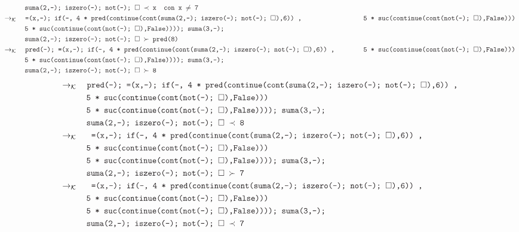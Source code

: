 \documentclass{article}
\newcommand{\tx}[1]{\textcolor{Black} {\texttt{#1}}}
\newcommand{\es}{$\square$}
\newcommand{\kr}{\rightarrow_{\mathcal{K}} \quad}
\begin{document}
\begin{enumerate}
\begin{enumerate}
\begin{align*}
			&\tx{\quad \quad \quad suma(2,-); iszero(-); not(-); \es $\ \prec $ x} \tx{\quad con x $\neq$ 7}\\	
			&\kr \tx{=(x,-); if(-, 4 * pred(continue(cont(suma(2,-); iszero(-); not(-); \es),6)) ,}
			&\tx{\quad \quad \quad 5 * suc(continue(cont(not(-); \es),False)))}\\
			&\tx {\quad \quad \quad 5 * suc(continue(cont(not(-); \es),False)))); suma(3,-);}\\
			&\tx{\quad \quad \quad suma(2,-); iszero(-); not(-); \es $\ \succ $ pred(8)} \\
			&\kr \tx{pred(-); =(x,-); if(-, 4 * pred(continue(cont(suma(2,-); iszero(-); not(-); \es),6)) ,}
			&\tx{\quad \quad \quad 5 * suc(continue(cont(not(-); \es),False)))}\\
			&\tx {\quad \quad \quad 5 * suc(continue(cont(not(-); \es),False)))); suma(3,-);}\\
			&\tx{\quad \quad \quad suma(2,-); iszero(-); not(-); \es $\ \succ $ 8} \\
			\end{align*}
			\begin{align*}
			&\kr \tx{pred(-); =(x,-); if(-, 4 * pred(continue(cont(suma(2,-); iszero(-); not(-); \es),6)) ,}\\
			&\tx{\quad \quad \quad 5 * suc(continue(cont(not(-); \es),False)))}\\
			&\tx {\quad \quad \quad 5 * suc(continue(cont(not(-); \es),False)))); suma(3,-);}\\
			&\tx{\quad \quad \quad suma(2,-); iszero(-); not(-); \es $\ \prec $ 8} \\
			&\kr \tx{ =(x,-); if(-, 4 * pred(continue(cont(suma(2,-); iszero(-); not(-); \es),6)) ,}\\
			&\tx{\quad \quad \quad 5 * suc(continue(cont(not(-); \es),False)))}\\
			&\tx {\quad \quad \quad 5 * suc(continue(cont(not(-); \es),False)))); suma(3,-);}\\
			&\tx{\quad \quad \quad suma(2,-); iszero(-); not(-); \es $\ \succ $ 7} \\
			&\kr \tx{ =(x,-); if(-, 4 * pred(continue(cont(suma(2,-); iszero(-); not(-); \es),6)) ,}\\
			&\tx{\quad \quad \quad 5 * suc(continue(cont(not(-); \es),False)))}\\
			&\tx {\quad \quad \quad 5 * suc(continue(cont(not(-); \es),False)))); suma(3,-);}\\
			&\tx{\quad \quad \quad suma(2,-); iszero(-); not(-); \es $\ \prec $ 7} \\

\end{align*}
\end{enumerate}
\end{enumerate}
\end{document}

